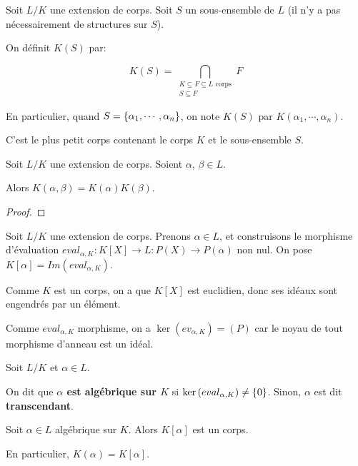 \begin{definition}
	Soit $L/K$ une extension de corps. Soit $S$ un sous-ensemble de $L$ (il n'y
	a pas nécessairement de structures sur $S$).

	On définit $K(S)$ par:

	\begin{equation}
		K(S) = \displaystyle \bigcap_{\substack{K \subseteq F \subseteq L
			\text{ corps} \\ S \subseteq F}} F
	\end{equation}

	En particulier, quand $S = \left\{ \alpha_{1}, \cdots, \alpha_{n} \right\}$, on note
	$K(S)$ par $K(\alpha_{1}, \cdots, \alpha_{n})$.

	C'est le plus petit corps contenant le corps $K$ et le sous-ensemble $S$.
\end{definition}

\begin{proposition}
	Soit $L/K$ une extension de corps. Soient $\alpha$, $\beta \in L$.

	Alors $K(\alpha, \beta) = K(\alpha)K(\beta)$.
\end{proposition}

\ifdefined\outputproof
\begin{proof}

\end{proof}
\fi

Soit $L/K$ une extension de corps. Prenons $\alpha \in L$, et construisons le
morphisme d'évaluation $eval_{\alpha, K} : K[X] \rightarrow L : P(X) \rightarrow
P(\alpha)$ non nul. On pose $K[\alpha] = Im(eval_{\alpha, K})$.

Comme $K$ est un corps, on a que $K[X]$ est euclidien, donc ses idéaux
sont engendrés par un élément.

Comme $eval_{\alpha, K}$ morphisme, on a $\ker{(ev_{\alpha, K})} = (P)$ car
le noyau de tout morphisme d'anneau est un idéal.

\begin{definition} 
	Soit $L/K$ et $\alpha \in L$.

	On dit que \textbf{$\alpha$ est algébrique sur $K$} si $\ker{(eval_{\alpha,
	K})} \neq \left\{ 0 \right\}$.  Sinon, $\alpha$ est dit \textbf{transcendant}.
\end{definition}

\begin{proposition}
	Soit $\alpha \in L$ algébrique sur $K$. Alors $K[\alpha]$ est un corps.

	En particulier, $K(\alpha) = K[\alpha]$.
\end{proposition}

